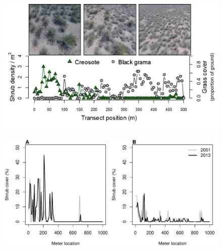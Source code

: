 \documentclass[11pt]{article}\usepackage[]{graphicx}\usepackage[usenames,dvipsnames]{xcolor}
\begin{document}
\newpage
\begin{figure}[H]
  \begin{center}
    \includegraphics[width=\linewidth]{Figures/WavesPicsRevise}
    \caption{}
  \label{fig:waves}
  \end{center}
\end{figure}

\newpage
\begin{figure}[H]
  \begin{center}
    \includegraphics[width=\linewidth]{Figures/TransectResurveys}
  \caption{}
  \label{fig:resurvey}
  \end{center}
\end{figure}
\end{document}
